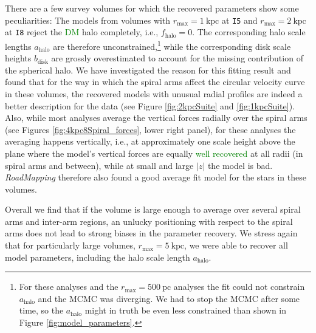 \documentclass[iop,revtex4,numberedappendix,appendixfloats]{emulateapj}
\newcommand{\RM}{{\sl RoadMapping}}
\newcommand{\NEW}[1]{\textcolor{Green}{#1}}
\newcommand{\OLD}[1]{}
\begin{document}
There are a few survey volumes for which the recovered parameters show some peculiarities: The models from volumes with $r_\text{max}=1~\text{kpc}$ at \texttt{I5} and $r_\text{max}=2~\text{kpc}$ at \texttt{I8} reject the \OLD{dark matter}\NEW{DM} halo completely, i.e., $f_\text{halo}=0$. The corresponding halo scale lengths $a_\text{halo}$ are therefore unconstrained,\footnote{For these analyses and the $r_\text{max}=500~\text{pc}$ analyses the fit could not constrain $a_\text{halo}$ and the MCMC was diverging. We had to stop the MCMC after some time, so the $a_\text{halo}$ might in truth be even less constrained than shown in Figure \ref{fig:model_parameters}.} while the corresponding disk scale heights $b_\text{disk}$ are grossly overestimated to account for the missing contribution of the spherical halo. We have investigated the reason for this fitting result and found that for the way in which the spiral arms affect the circular velocity curve in these volumes, the recovered models with unusual radial profiles are indeed a better description for the data (see Figure \ref{fig:2kpcSuite} and \ref{fig:1kpcSuite}). Also, while most analyses average the vertical forces radially over the spiral arms (see Figures \ref{fig:4kpc8Spiral_forces}, lower right panel), for these analyses the averaging happens vertically, i.e., at approximately one scale height above the plane where the model's vertical forces are equally \OLD{good}\NEW{well recovered} at all radii (in spiral arms and between), while at small and large $|z|$ the model is bad\OLD{ (see also Figure \ref{fig:Fg_vs_z} in Section \ref{sec:forces_bias})}. \RM{} therefore also found a good average fit model for the stars in these volumes. 

Overall we find that if the volume is large enough to average over several spiral arms and inter-arm regions, an unlucky positioning with respect to the spiral arms does not lead to strong biases in the parameter recovery. We stress again that for particularly large volumes, $r_\text{max}=5~\text{kpc}$, we were able to recover all model parameters, including the halo scale length $a_\text{halo}$.
\end{document}
